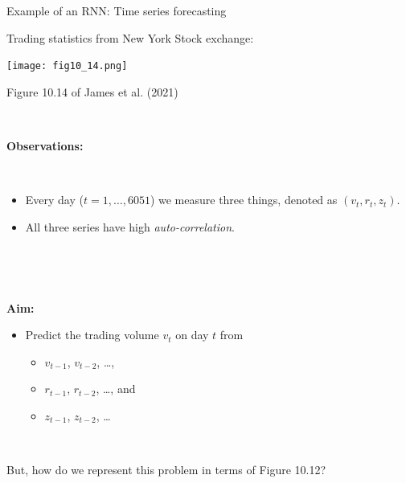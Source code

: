 \documentclass[
  10pt,
  ignorenonframetext,
]{beamer}
\providecommand{\tightlist}{%
  \setlength{\itemsep}{0pt}\setlength{\parskip}{0pt}}
\begin{document}
\begin{frame}
\begin{block}{Example of an RNN: Time series forecasting}
\protect\hypertarget{example-of-an-rnn-time-series-forecasting}{}
\vspace{2mm}

Trading statistics from New York Stock exchange:

\centering

\texttt{[image: fig10\_14.png]}

\scriptsize Figure 10.14 of James et al. (2021)
\end{block}
\end{frame}

\begin{frame}
\(~\)

\textbf{Observations: }

\(~\)

\begin{itemize}
\item
  Every day (\(t=1,\ldots, 6051\)) we measure three things, denoted as
  \((v_t, r_t, z_t)\).
\item
  All three series have high \emph{auto-correlation}.
\end{itemize}

\(~\)

\(~\)

\textbf{Aim:}

\begin{itemize}
\tightlist
\item
  Predict the trading volume \(v_t\) on day \(t\) from

  \begin{itemize}
  \tightlist
  \item
    \(v_{t-1}\), \(v_{t-2}\), \ldots,
  \item
    \(r_{t-1}\), \(r_{t-2}\), \ldots, and
  \item
    \(z_{t-1}\), \(z_{t-2}\), \ldots{}
  \end{itemize}
\end{itemize}

\(~\)

But, how do we represent this problem in terms of Figure 10.12?
\end{frame}
\end{document}
